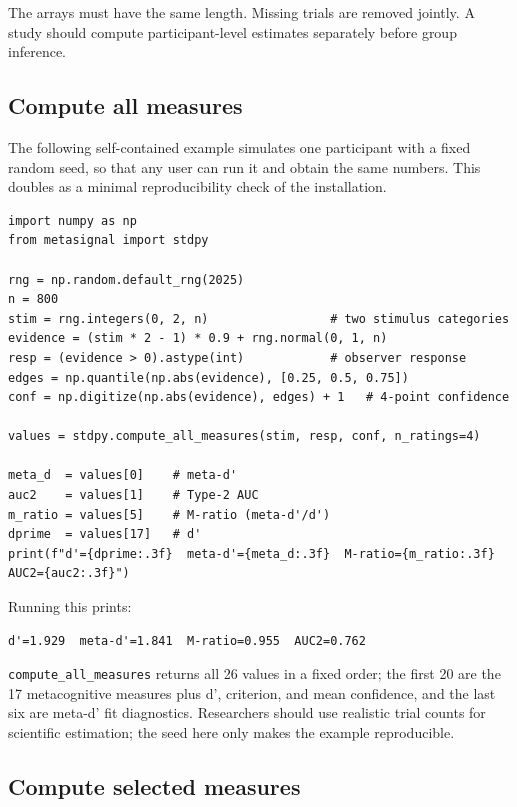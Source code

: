 \documentclass{article}
\begin{document}
The arrays must have the same length. Missing trials are removed jointly. A study should compute participant-level estimates separately before group inference.

\subsection{Compute all measures}\label{compute-all-measures}

The following self-contained example simulates one participant with a fixed random seed, so that any user can run it and obtain the same numbers. This doubles as a minimal reproducibility check of the installation.

\begin{verbatim}
import numpy as np
from metasignal import stdpy

rng = np.random.default_rng(2025)
n = 800
stim = rng.integers(0, 2, n)                 # two stimulus categories
evidence = (stim * 2 - 1) * 0.9 + rng.normal(0, 1, n)
resp = (evidence > 0).astype(int)            # observer response
edges = np.quantile(np.abs(evidence), [0.25, 0.5, 0.75])
conf = np.digitize(np.abs(evidence), edges) + 1   # 4-point confidence

values = stdpy.compute_all_measures(stim, resp, conf, n_ratings=4)

meta_d  = values[0]    # meta-d'
auc2    = values[1]    # Type-2 AUC
m_ratio = values[5]    # M-ratio (meta-d'/d')
dprime  = values[17]   # d'
print(f"d'={dprime:.3f}  meta-d'={meta_d:.3f}  M-ratio={m_ratio:.3f}  AUC2={auc2:.3f}")
\end{verbatim}

Running this prints:

\begin{verbatim}
d'=1.929  meta-d'=1.841  M-ratio=0.955  AUC2=0.762
\end{verbatim}

\texttt{compute\_all\_measures} returns all 26 values in a fixed order; the first 20 are the 17 metacognitive measures plus d', criterion, and mean confidence, and the last six are meta-d' fit diagnostics. Researchers should use realistic trial counts for scientific estimation; the seed here only makes the example reproducible.

\subsection{Compute selected measures}\label{compute-selected-measures}
\end{document}
